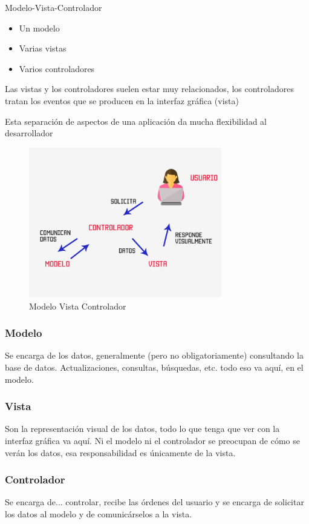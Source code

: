 Modelo-Vista-Controlador
\begin{itemize}
    \item Un modelo
    \item Varias vistas
    \item Varios controladores
\end{itemize}

Las vistas y los controladores suelen estar muy relacionados, los controladores tratan los eventos que se producen en la
interfaz gráfica (vista)

Esta separación de aspectos de una aplicación da mucha
flexibilidad al desarrollador \cite{mvc}

\begin{figure}[H]
\centering
\includegraphics[width=0.75\textwidth]{imagenes/mvc}
\caption{Modelo Vista Controlador}
\label{img:mvc}
\end{figure}

\subsubsection{Modelo}
Se encarga de los datos, generalmente (pero no obligatoriamente) consultando la base de datos. Actualizaciones, consultas, búsquedas, etc. todo eso va aquí, en el modelo. \cite{mvc2}
\\\newline
\subsubsection{Vista}
Son la representación visual de los datos, todo lo que tenga que ver con la interfaz gráfica va aquí. Ni el modelo ni el controlador se preocupan de cómo se verán los datos, esa responsabilidad es únicamente de la vista. \cite{mvc2}
\\\newline
\subsubsection{Controlador}
Se encarga de... controlar, recibe las órdenes del usuario y se encarga de solicitar los datos al modelo y de comunicárselos a la vista. \cite{mvc2}
\\\newline



